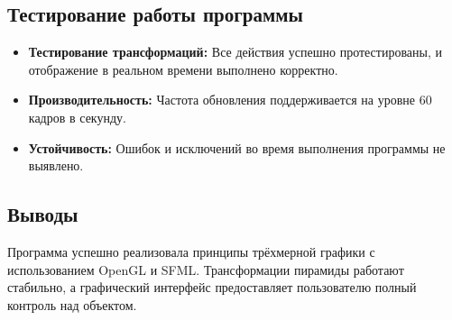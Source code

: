 \subsection*{Тестирование работы программы}
\begin{itemize}
    \item \textbf{Тестирование трансформаций:} Все действия успешно протестированы, и отображение в реальном времени выполнено корректно.
    \item \textbf{Производительность:} Частота обновления поддерживается на уровне $60$ кадров в секунду.
    \item \textbf{Устойчивость:} Ошибок и исключений во время выполнения программы не выявлено.
\end{itemize}

\subsection*{Выводы}
Программа успешно реализовала принципы трёхмерной графики с использованием OpenGL и SFML. Трансформации пирамиды работают стабильно, а графический интерфейс предоставляет пользователю полный контроль над объектом.
